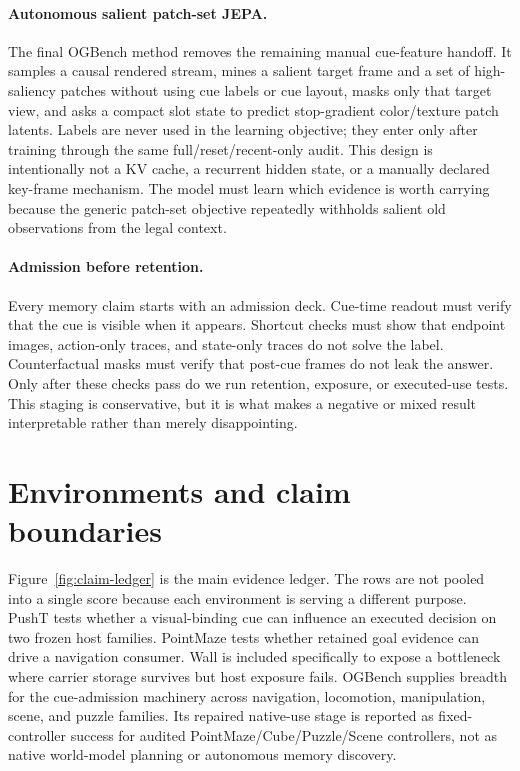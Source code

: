 \paragraph{Autonomous salient patch-set JEPA.}
The final OGBench method removes the remaining manual cue-feature handoff.  It
samples a causal rendered stream, mines a salient target frame and a set of
high-saliency patches without using cue labels or cue layout, masks only that
target view, and asks a compact slot state to predict stop-gradient
color/texture patch latents.  Labels are never used in the learning objective;
they enter only after training through the same full/reset/recent-only audit.
This design is intentionally not a KV cache, a recurrent hidden state, or a
manually declared key-frame mechanism.  The model must learn which evidence is
worth carrying because the generic patch-set objective repeatedly withholds
salient old observations from the legal context.

\paragraph{Admission before retention.}
Every memory claim starts with an admission deck.  Cue-time readout must verify
that the cue is visible when it appears.  Shortcut checks must show that
endpoint images, action-only traces, and state-only traces do not solve the
label.  Counterfactual masks must verify that post-cue frames do not leak the
answer.  Only after these checks pass do we run retention, exposure, or
executed-use tests.  This staging is conservative, but it is what makes a
negative or mixed result interpretable rather than merely disappointing.

\section{Environments and claim boundaries}

Figure~\ref{fig:claim-ledger} is the main evidence ledger.  The rows are not
pooled into a single score because each environment is serving a different
purpose.  PushT tests whether a visual-binding cue can influence an executed
decision on two frozen host families.  PointMaze tests whether retained goal
evidence can drive a navigation consumer.  Wall is included specifically to
expose a bottleneck where carrier storage survives but host exposure fails.
OGBench supplies breadth for the cue-admission machinery across navigation,
locomotion, manipulation, scene, and puzzle families.  Its repaired native-use
stage is reported as fixed-controller success for audited
PointMaze/Cube/Puzzle/Scene controllers, not as native world-model planning or
autonomous memory discovery.

